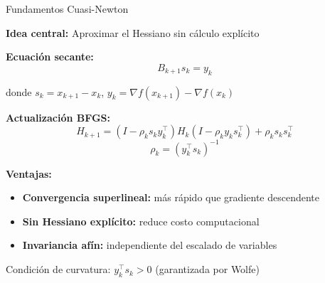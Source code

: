 \documentclass[
  ignorenonframetext,
]{beamer}
\begin{document}
\begin{frame}{Fundamentos Cuasi-Newton}
\label{fundamentos-cuasi-newton}
\justifying

\textbf{Idea central:} Aproximar el Hessiano sin cálculo explícito

\vspace{0.3cm}

\textbf{Ecuación secante:} \[B_{k+1} s_k = y_k\]

donde \(s_k = x_{k+1} - x_k\),
\(y_k = \nabla f(x_{k+1}) - \nabla f(x_k)\)

\vspace{0.3cm}

\textbf{Actualización BFGS:}
\[H_{k+1} = (I - \rho_k s_k y_k^\top) H_k (I - \rho_k y_k s_k^\top) + \rho_k s_k s_k^\top\]
\[\rho_k = (y_k^\top s_k)^{-1}\]

\textbf{Ventajas:}

\begin{itemize}
\item \textbf{Convergencia superlineal:} más rápido que gradiente descendente
\item \textbf{Sin Hessiano explícito:} reduce costo computacional
\item \textbf{Invariancia afín:} independiente del escalado de variables
\end{itemize}

\vspace{0.3cm}

\alert{Condición de curvatura:} \(y_k^\top s_k > 0\) (garantizada por
Wolfe)
\end{frame}
\end{document}
